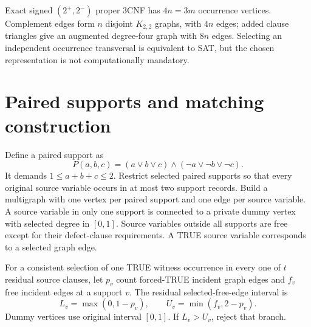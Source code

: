 \documentclass[11pt]{article}
\begin{document}
Exact signed $(2^+,2^-)$ proper 3CNF has $4n=3m$ occurrence vertices. Complement edges form $n$ disjoint $K_{2,2}$ graphs, with $4n$ edges; added clause triangles give an augmented degree-four graph with $8n$ edges. Selecting an independent occurrence transversal is equivalent to SAT, but the chosen representation is not computationally mandatory.

\section{Paired supports and matching construction}
Define a paired support as
\[
P(a,b,c)=(a\vee b\vee c)\land(\neg a\vee\neg b\vee\neg c).
\]
It demands $1\le a+b+c\le2$. Restrict selected paired supports so that every original source variable occurs in at most two support records. Build a multigraph with one vertex per paired support and one edge per source variable. A source variable in only one support is connected to a private dummy vertex with selected degree in $[0,1]$. Source variables outside all supports are free except for their defect-clause requirements. A TRUE source variable corresponds to a selected graph edge.

For a consistent selection of one TRUE witness occurrence in every one of $t$ residual source clauses, let $p_v$ count forced-TRUE incident graph edges and $f_v$ free incident edges at a support $v$. The residual selected-free-edge interval is
\[
L_v=\max(0,1-p_v),\qquad U_v=\min(f_v,2-p_v).
\]
Dummy vertices use original interval $[0,1]$. If $L_v>U_v$, reject that branch.
\end{document}
